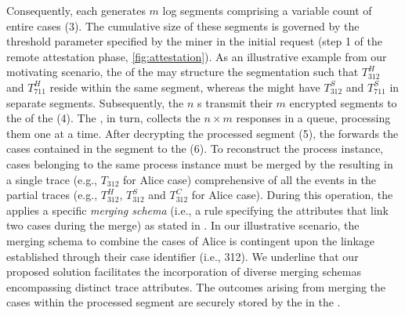 Consequently, each  generates $m$ log segments comprising a variable count of entire cases (3). The cumulative size of these segments is governed by the threshold parameter specified by the miner in the initial request (step 1 of the remote attestation phase, \cref{fig:attestation}). As an illustrative example from our motivating scenario, the  of the  may structure the segmentation such that $T^H_{312}$ and $T^H_{711}$ reside within the same segment, whereas the  might have $T^S_{312}$ and $T^S_{711}$ in separate segments. Subsequently, the $n$ s transmit their $m$ encrypted segments to the  of the  (4). The , in turn, collects the $n \times m$ responses in a queue, processing them one at a time. After decrypting the processed segment (5), the  forwards the cases contained in the segment to the  (6). To reconstruct the process instance, cases belonging to the same process instance must be merged by the  resulting in a single trace (e.g., $T_{312}$ for Alice case) comprehensive of all the events in the partial traces (e.g., $T^H_{312}$, $T^S_{312}$ and $T^C_{312}$ for Alice case). During this operation, the  applies a specific \textit{merging schema} (i.e., a rule specifying the attributes that link two cases during the merge) as stated in \citep{claes2014merging}. In our illustrative scenario, the merging schema to combine the cases of Alice is contingent upon the linkage established through their case identifier (i.e., 312). We underline that our proposed solution facilitates the incorporation of diverse merging schemas encompassing distinct trace attributes. The outcomes arising from merging the cases within the processed segment are securely stored by the  in the .

